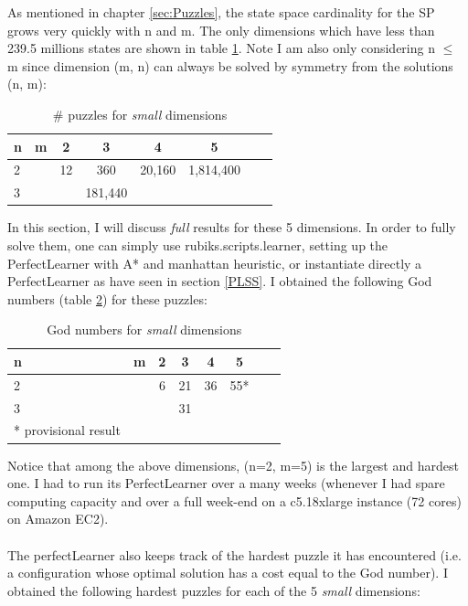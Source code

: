 As mentioned in chapter \ref{sec:Puzzles}, the state space cardinality for the SP grows very quickly with n and m. The only dimensions which have less than 239.5 millions states are shown in table \ref{tab:smallSP}. Note I am also only considering n $\leq$ m since dimension (m, n) can always be solved by symmetry from the solutions (n, m):

\begin{table}[H]
\begin{center}
\begin{tabular}{l*{6}{c}r}
n              & m & 2 & 3 & 4 & 5\\
\hline
2              &   & 12 & 360 & 20,160 & 1,814,400 \\
3              &   &   & 181,440 &  &    \\
\end{tabular}
\caption{\label{tab:smallSP}\# puzzles for \textit{small} dimensions}
\end{center}
\end{table}
In this section, I will discuss \textit{full} results for these 5 dimensions. In order to fully solve them, one can simply use rubiks.scripts.learner, setting up the PerfectLearner with A* and manhattan heuristic, or instantiate directly a PerfectLearner as have seen in section \ref{PLSS}. I obtained the following God numbers (table \ref{tab:smallSPGN}) for these puzzles:
\begin{table}[H]
\begin{center}
\begin{tabular}{l*{6}{c}r}
n              & m & 2 & 3 & 4 & 5\\
\hline
2              &   & 6 & 21 & 36 & 55* \\
3              &   &   & 31 &  &    \\
* \tiny{provisional result}
\end{tabular}
\caption{\label{tab:smallSPGN}God numbers for \textit{small} dimensions}
\end{center}
\end{table}
Notice that among the above dimensions, (n=2, m=5) is the largest and hardest one. I had to run its PerfectLearner over a many weeks (whenever I had spare computing capacity and over a full week-end on a c5.18xlarge instance (72 cores) on Amazon EC2).
\\
\\
The perfectLearner also keeps track of the hardest puzzle it has encountered (i.e. a configuration whose optimal solution has a cost equal to the God number). I obtained the following hardest puzzles for each of the 5 \textit{small} dimensions:
